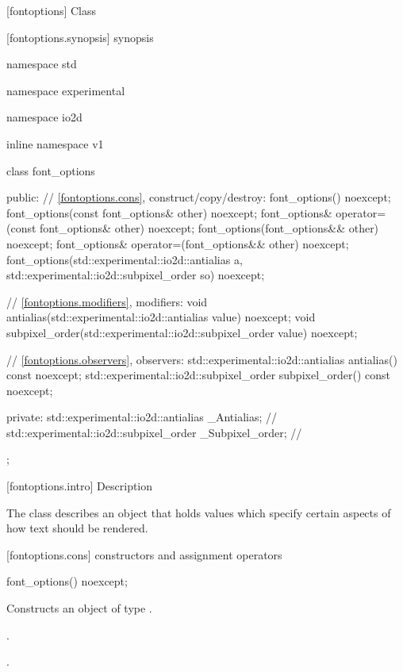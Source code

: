  [fontoptions] {Class }

 [fontoptions.synopsis] { synopsis}

\begin{codeblock}
namespace std { namespace experimental { namespace io2d { inline namespace v1 {
  class font_options {
    public:
    // \ref{fontoptions.cons}, construct/copy/destroy:
    font_options() noexcept;
    font_options(const font_options& other) noexcept;
    font_options& operator=(const font_options& other) noexcept;
    font_options(font_options&& other) noexcept;
    font_options& operator=(font_options&& other) noexcept;
    font_options(std::experimental::io2d::antialias a,
      std::experimental::io2d::subpixel_order so) noexcept;

    // \ref{fontoptions.modifiers}, modifiers:
    void antialias(std::experimental::io2d::antialias value) noexcept;
    void subpixel_order(std::experimental::io2d::subpixel_order value) noexcept;

    // \ref{fontoptions.observers}, observers:
    std::experimental::io2d::antialias antialias() const noexcept;
    std::experimental::io2d::subpixel_order subpixel_order() const noexcept;

  private:
    std::experimental::io2d::antialias _Antialias;           // \expos
    std::experimental::io2d::subpixel_order _Subpixel_order; // \expos
  };
} } } }
\end{codeblock}

 [fontoptions.intro] { Description}

\pnum
{}
The  class describes an object that holds values which specify certain aspects of how text should be rendered.

 [fontoptions.cons] { constructors and assignment operators}

\begin{itemdecl}
    font_options() noexcept;
\end{itemdecl}
\begin{itemdescr}
	\pnum
	\effects
	Constructs an object of type .
	
	\pnum
	\postconditions
	.
	
	.
	
\end{itemdescr}

